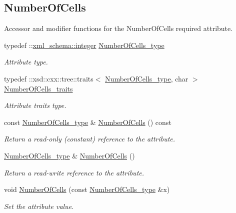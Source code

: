 \subsection*{Number\+Of\+Cells}
\label{_amgrp967ac3c5aad15a640629bb3adc1fc287}%
Accessor and modifier functions for the Number\+Of\+Cells required attribute. \begin{DoxyCompactItemize}
\item 
typedef \+::\hyperlink{namespacexml__schema_aaaea7c8ce4dfbe26cc52c91c29c97b7c}{xml\+\_\+schema\+::integer} \hyperlink{classPieceUnstructuredGrid__t_aeae5546900c50a4abe9b3aea485e97d0}{Number\+Of\+Cells\+\_\+type}
\begin{DoxyCompactList}\small\item\em Attribute type. \end{DoxyCompactList}\item 
typedef \+::xsd\+::cxx\+::tree\+::traits$<$ \hyperlink{classPieceUnstructuredGrid__t_aeae5546900c50a4abe9b3aea485e97d0}{Number\+Of\+Cells\+\_\+type}, char $>$ \hyperlink{classPieceUnstructuredGrid__t_a7c7607d306bde9e187b9cb3f570d6155}{Number\+Of\+Cells\+\_\+traits}
\begin{DoxyCompactList}\small\item\em Attribute traits type. \end{DoxyCompactList}\item 
const \hyperlink{classPieceUnstructuredGrid__t_aeae5546900c50a4abe9b3aea485e97d0}{Number\+Of\+Cells\+\_\+type} \& \hyperlink{classPieceUnstructuredGrid__t_a6e395db39208cc81f9d7093c50d5d334}{Number\+Of\+Cells} () const 
\begin{DoxyCompactList}\small\item\em Return a read-\/only (constant) reference to the attribute. \end{DoxyCompactList}\item 
\hyperlink{classPieceUnstructuredGrid__t_aeae5546900c50a4abe9b3aea485e97d0}{Number\+Of\+Cells\+\_\+type} \& \hyperlink{classPieceUnstructuredGrid__t_abe5f21a859d968d4b23a9b7ad790a7b3}{Number\+Of\+Cells} ()
\begin{DoxyCompactList}\small\item\em Return a read-\/write reference to the attribute. \end{DoxyCompactList}\item 
void \hyperlink{classPieceUnstructuredGrid__t_a25296cecd9f9c30f8c75ed8b750c1ad7}{Number\+Of\+Cells} (const \hyperlink{classPieceUnstructuredGrid__t_aeae5546900c50a4abe9b3aea485e97d0}{Number\+Of\+Cells\+\_\+type} \&x)
\begin{DoxyCompactList}\small\item\em Set the attribute value. \end{DoxyCompactList}\end{DoxyCompactItemize}
